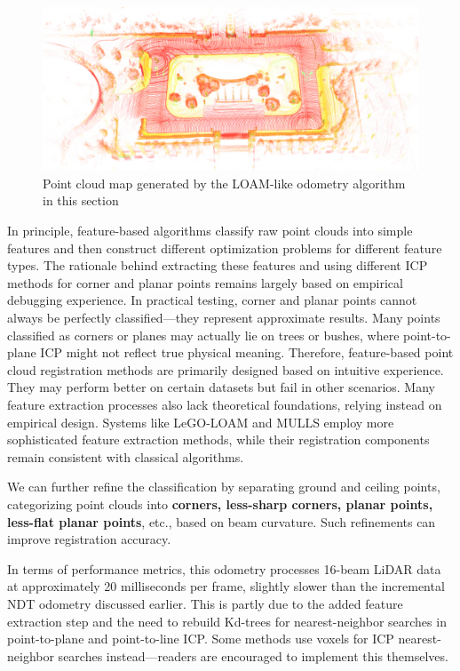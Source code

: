 \begin{figure}[!thp]
	\centering  
	\includegraphics[width=.8\textwidth]{resources/3d-lidar-mapping/ch7-loam-map}  
	\caption{Point cloud map generated by the LOAM-like odometry algorithm in this section}  
	\label{fig:loam-map}  
\end{figure}

In principle, feature-based algorithms classify raw point clouds into simple features and then construct different optimization problems for different feature types. The rationale behind extracting these features and using different ICP methods for corner and planar points remains largely based on empirical debugging experience. In practical testing, corner and planar points cannot always be perfectly classified—they represent approximate results. Many points classified as corners or planes may actually lie on trees or bushes, where point-to-plane ICP might not reflect true physical meaning. Therefore, feature-based point cloud registration methods are primarily designed based on intuitive experience. They may perform better on certain datasets but fail in other scenarios. Many feature extraction processes also lack theoretical foundations, relying instead on empirical design. Systems like LeGO-LOAM and MULLS employ more sophisticated feature extraction methods, while their registration components remain consistent with classical algorithms.  

We can further refine the classification by separating ground and ceiling points, categorizing point clouds into \textbf{corners, less-sharp corners, planar points, less-flat planar points}, etc., based on beam curvature. Such refinements can improve registration accuracy.  

In terms of performance metrics, this odometry processes 16-beam LiDAR data at approximately 20 milliseconds per frame, slightly slower than the incremental NDT odometry discussed earlier. This is partly due to the added feature extraction step and the need to rebuild Kd-trees for nearest-neighbor searches in point-to-plane and point-to-line ICP. Some methods use voxels for ICP nearest-neighbor searches instead—readers are encouraged to implement this themselves.  

